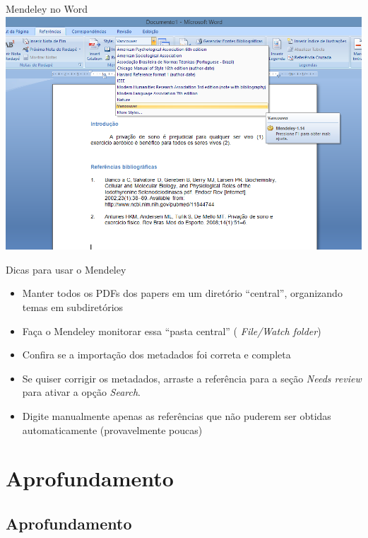 \documentclass{beamer}
\begin{document}
\begin{frame}{Mendeley no Word}
  \centering
  \includegraphics[width=1.1\textwidth]{Referencias/mendeley-word-vancouver}
\end{frame}

\begin{frame}{Dicas para usar o Mendeley}
  \begin{itemize}
    \footnotesize
  \item Manter \alert{todos} os PDFs dos papers em um diretório
    ``central'', organizando temas em subdiretórios
  \item Faça o Mendeley \alert{monitorar} essa ``pasta central'' ({\em
      File/Watch folder})
  \item Confira se a importação dos metadados foi correta e completa
  \item Se quiser corrigir os metadados, arraste a referência para a
    seção {\em Needs review} para ativar a opção {\em Search}.
  \item Digite manualmente apenas as referências que não puderem ser
    obtidas automaticamente (provavelmente poucas)
  \end{itemize}
\end{frame}

\section{Aprofundamento}

\subsection{Aprofundamento}
\end{document}
